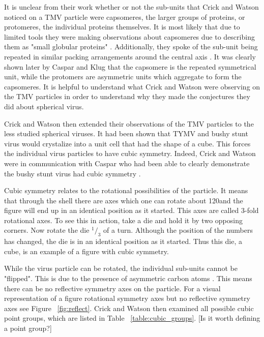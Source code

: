 \documentclass[12pt,letter]{article}
\newcommand*\rfrac[2]{{}^{#1}\!/_{#2}}
\begin{document}
It is unclear from their work whether or not the sub-units that Crick and Watson noticed on a TMV particle were capsomeres, the larger groups of proteins, or protomeres, the individual proteins themselves. It is most likely that due to limited tools they were making observations about capsomeres due to describing them as "small globular proteins" \cite[p 473]{Crick:1956}. Additionally, they spoke of the sub-unit being repeated in similar packing arrangements around the central axis \cite[p 474]{Crick:1956}. It was clearly shown later by Caspar and Klug that the capsomere is the repeated symmetrical unit, while the protomers are asymmetric units which aggregate to form the capsomeres. It is helpful to understand what Crick and Watson were observing on the TMV particles in order to understand why they made the conjectures they did about spherical virus.

Crick and Watson then extended their observations of the TMV particles to the less studied spherical viruses. It had been shown that TYMV and bushy stunt virus would crystalize into a unit cell that had the shape of a cube. This forces the individual virus particles to have cubic symmetry. Indeed, Crick and Watson were in communication with Caspar who had been able to clearly demonstrate the bushy stunt virus had cubic symmetry \cite[p 474]{Crick:1956}. 

Cubic symmetry relates to the rotational possibilities of the particle. It means that through the shell there are axes which one can rotate about 120\degree and the figure will end up in an identical position as it started. This axes are called 3-fold rotational axes. To see this in action, take a die and hold it by two opposing corners. Now rotate the die $\rfrac{1}{3}$ of a turn. Although the position of the numbers has changed, the die is in an identical position as it started. Thus this die, a cube, is an example of a figure with cubic symmetry.

While the virus particle can be rotated, the individual sub-units cannot be "flipped". This is due to the presence of asymmetric carbon atoms \cite[p 474]{Crick:1956}. This means there can be no reflective symmetry axes on the particle. For a visual representation of a figure rotational symmetry axes but no reflective symmetry axes see Figure ~\ref{fig:reflect}. Crick and Watson then examined all possible cubic point groups, which are listed in Table ~\ref{table:cubic_groups}. [Is it worth defining a point group?]
\end{document}
